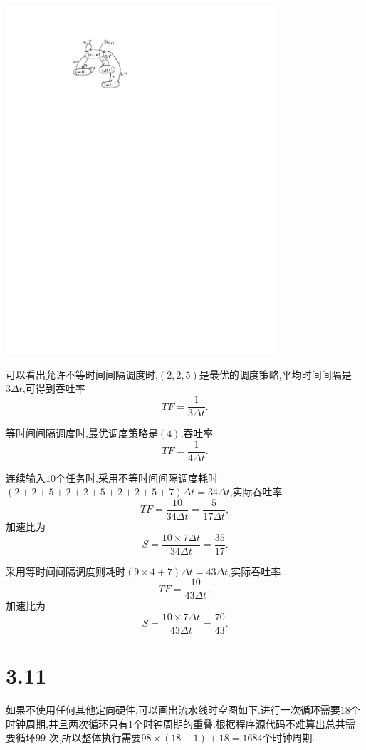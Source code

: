 \documentclass[adobefonts, nocap]{ctexart}
\begin{document}
    \begin{center}
      \includegraphics[width=10cm]{3-crop.pdf}
    \end{center}

    可以看出允许不等时间间隔调度时,$(2,2,5)$是最优的调度策略,平均时间间隔是$3\Delta t$,可得到吞吐率
    \[
      TF=\frac{1}{3\Delta t}.
    \]

    等时间间隔调度时,最优调度策略是$(4)$,吞吐率
    \[
      TF=\frac{1}{4\Delta t}.
    \]

    连续输入$10$个任务时,采用不等时间间隔调度耗时$(2+2+5+2+2+5+2+2+5+7)\Delta t=34\Delta t$,实际吞吐率
    \[
      TF=\frac{10}{34\Delta t}=\frac{5}{17\Delta t},
    \]
    加速比为
    \[
      S=\frac{10\times 7\Delta t}{34\Delta t}=\frac{35}{17}.
    \]

    采用等时间间隔调度则耗时$(9\times 4+7)\Delta t=43\Delta t$,实际吞吐率
    \[
      TF=\frac{10}{43\Delta t},
    \]
    加速比为
    \[
      S=\frac{10\times 7\Delta t}{43\Delta t}=\frac{70}{43}.
    \]
  \section*{3.11}
    如果不使用任何其他定向硬件,可以画出流水线时空图如下.进行一次循环需要$18$个时钟周期,并且两次循环只有$1$个时钟周期的重叠.根据程序源代码不难算出总共需要循环$99$
    次,所以整体执行需要$98\times (18-1)+18=1684$个时钟周期.
\end{document}
